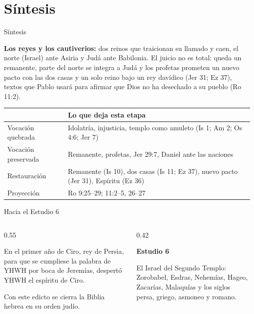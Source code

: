 \section{Síntesis}
\begin{frame}{Síntesis}
\begin{tcolorbox}[colback=piedra,colframe=ladrillo,boxrule=1pt,arc=3pt,fontupper=\footnotesize]
\textbf{\textcolor{cafe}{Los reyes y los cautiverios:}} dos reinos que traicionan su llamado y caen, el norte (Israel) ante Asiria y Judá ante Babilonia. El juicio no es total: queda un remanente, parte del norte se integra a Judá y los profetas prometen un nuevo pacto con las dos casas y un solo reino bajo un rey davídico (Jer 31; Ez 37), textos que Pablo usará para afirmar que Dios no ha desechado a su pueblo (Ro 11:2).
\end{tcolorbox}
\vspace{2pt}
\scriptsize\renewcommand{\arraystretch}{1.25}
\begin{tabular}{>{\RaggedRight\arraybackslash}p{3.0cm}>{\RaggedRight\arraybackslash}p{8.3cm}}
\toprule
{\color{ladrillo}\bfseries Eje} & {\color{ladrillo}\bfseries Lo que deja esta etapa}\\\midrule
Vocación quebrada & Idolatría, injusticia, templo como amuleto (Is 1; Am 2; Os 4:6; Jer 7)\\
Vocación preservada & Remanente, profetas, Jer 29:7, Daniel ante las naciones\\
Restauración & Remanente (Is 10), dos casas (Is 11; Ez 37), nuevo pacto (Jer 31), Espíritu (Ez 36)\\
Proyección & Ro 9:25--29; 11:2--5, 26--27\\
\bottomrule
\end{tabular}
\end{frame}

\begin{frame}{Hacia el Estudio 6}
\begin{columns}[c,onlytextwidth]
\begin{column}{0.55\textwidth}
\begin{cita}En el primer año de Ciro, rey de Persia, para que se cumpliese la palabra de YHWH por boca de Jeremías, despertó YHWH el espíritu de Ciro.\end{cita}
\small Con este edicto se cierra la Biblia hebrea en su orden judío.
\end{column}
\begin{column}{0.42\textwidth}
\begin{tcolorbox}[colback=cafe,colframe=cafeosc,coltext=piedra,boxrule=0.8pt,arc=3pt,fontupper=\small]
\textbf{Estudio 6}\par\smallskip
El Israel del Segundo Templo: Zorobabel, Esdras, Nehemías, Hageo, Zacarías, Malaquías y los siglos persa, griego, asmoneo y romano.
\end{tcolorbox}
\end{column}
\end{columns}
\end{frame}

